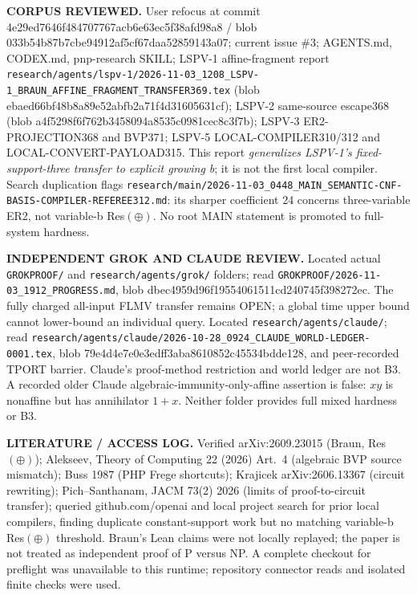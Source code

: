 \documentclass[11pt]{article}
\begin{document}
\noindent\textbf{CORPUS REVIEWED.} User refocus at commit 4e29ed7646f484707767acb6e63ec5f38afd98a8 / blob 033b54b87b7cbe94912af5cf67daa52859143a07; current issue \#3; AGENTS.md, CODEX.md, pnp-research SKILL; LSPV-1 affine-fragment report \texttt{research/agents/lspv-1/2026-11-03\_1208\_LSPV-1\_BRAUN\_AFFINE\_FRAGMENT\_TRANSFER369.tex} (blob ebaed66bf48b8a89e52abfb2a71f4d31605631cf); LSPV-2 same-source escape368 (blob a4f5298f6f762b3458094a8535c0981cec8c3f7b); LSPV-3 ER2-PROJECTION368 and BVP371; LSPV-5 LOCAL-COMPILER310/312 and LOCAL-CONVERT-PAYLOAD315. This report \emph{generalizes LSPV-1's fixed-support-three transfer to explicit growing b}; it is not the first local compiler. Search duplication flags \texttt{research/main/2026-11-03\_0448\_MAIN\_SEMANTIC-CNF-BASIS-COMPILER-REFEREE312.md}: its sharper coefficient 24 concerns three-variable ER2, not variable-b Res$(\oplus)$. No root MAIN statement is promoted to full-system hardness.

\noindent\textbf{INDEPENDENT GROK AND CLAUDE REVIEW.} Located actual \texttt{GROKPROOF/} and \texttt{research/agents/grok/} folders; read \texttt{GROKPROOF/2026-11-03\_1912\_PROGRESS.md}, blob dbec4959d96f19554061511cd240745f398272ec. The fully charged all-input FLMV transfer remains OPEN; a global time upper bound cannot lower-bound an individual query. Located \texttt{research/agents/claude/}; read \texttt{research/agents/claude/2026-10-28\_0924\_CLAUDE\_WORLD-LEDGER-0001.tex}, blob 79e4d4e7e0e3edff3aba8610852c45534bdde128, and peer-recorded TPORT barrier. Claude's proof-method restriction and world ledger are not B3. A recorded older Claude algebraic-immunity-only-affine assertion is false: $xy$ is nonaffine but has annihilator $1+x$. Neither folder provides full mixed hardness or B3.

\noindent\textbf{LITERATURE / ACCESS LOG.} Verified arXiv:2609.23015 (Braun, Res$(\oplus)$); Alekseev, Theory of Computing 22 (2026) Art.~4 (algebraic BVP source mismatch); Buss 1987 (PHP Frege shortcuts); Krajicek arXiv:2606.13367 (circuit rewriting); Pich--Santhanam, JACM 73(2) 2026 (limits of proof-to-circuit transfer); queried github.com/openai and local project search for prior local compilers, finding duplicate constant-support work but no matching variable-b Res$(\oplus)$ threshold. Braun's Lean claims were not locally replayed; the paper is not treated as independent proof of P versus NP. A complete checkout for preflight was unavailable to this runtime; repository connector reads and isolated finite checks were used.
\end{document}
